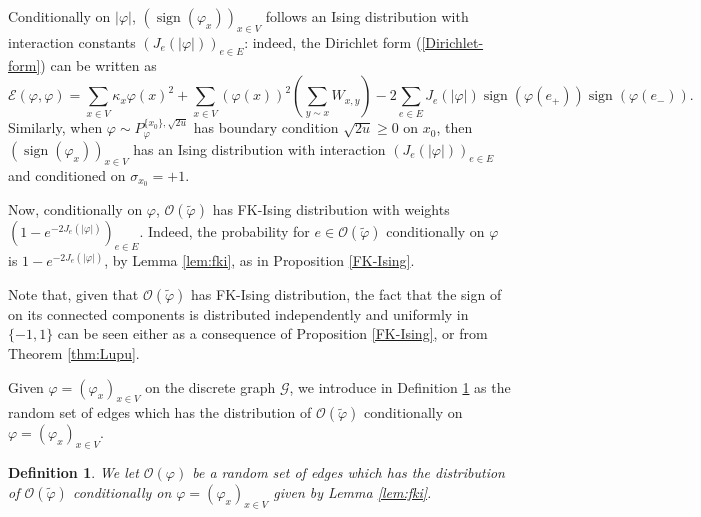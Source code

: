 \documentclass[11pt,a4paper]{amsart}
\numberwithin{equation}{section}
\newtheorem{definition}{Definition}[section]
\begin{document}
Conditionally on $\vert\varphi\vert$,
$(\operatorname{sign}(\varphi_{x}))_{x\in V}$ follows an Ising distribution with interaction constants $(J_{e}(\vert\varphi\vert))_{e\in E}$:
indeed, the Dirichlet form (\ref{Dirichlet-form}) can be written as
\begin{displaymath}
\mathcal{E}(\varphi,\varphi)=\sum_{x\in V}\kappa_{x} \varphi(x)^{2}+
\sum_{x\in V}(\varphi(x))^2(\sum_{y\sim x} W_{x,y})-
2\sum_{e\in E}J_e(\vert\varphi\vert) \operatorname{sign}(\varphi(e_{+}))\operatorname{sign}(\varphi(e_{-})).
\end{displaymath}
Similarly, when $\varphi\sim P_{\varphi}^{\{x_0\},\sqrt{2u}}$ has boundary condition $\sqrt{2u}\ge 0$ on $x_0$, then $(\operatorname{sign}(\varphi_{x}))_{x\in V}$ has an Ising distribution
with interaction $(J_{e}(\vert\varphi\vert))_{e\in E}$ and conditioned on $\sigma_{x_0}=+1$.

Now, conditionally on $\varphi$, $\mathcal{O}(\tilde{\varphi})$ has FK-Ising distribution  with weights
$(1-e^{-2J_{e}(\vert\varphi\vert)})_{e\in E}$. Indeed, the probability for $e\in\mathcal{O}(\tilde{\varphi})$ conditionally on $\varphi$ is $1-e^{-2J_{e}(\vert\varphi\vert)}$,  by Lemma \ref{lem:fki}, as in Proposition \ref{FK-Ising}. 

Note that, given that $\mathcal{O}(\tilde{\varphi})$ has FK-Ising distribution, the fact that the sign of on its connected components is distributed independently and uniformly in $\{-1,1\}$ can be seen either as a consequence of Proposition \ref{FK-Ising}, or from Theorem \ref{thm:Lupu}.

Given $\varphi=(\varphi_x)_{x\in V}$ on the discrete graph $\mathcal{G}$, we introduce in Definition \ref{def_FK-Ising} as the random set of edges which has the distribution of $\mathcal{O}(\tilde{\varphi})$ conditionally on $\varphi=(\varphi_x)_{x\in V}$. 
\begin{definition}\label{def_FK-Ising}
We let $\mathcal{O}(\varphi)$ be a random set of edges which has the distribution of $\mathcal{O}(\tilde{\varphi})$ conditionally on $\varphi=(\varphi_x)_{x\in V}$ given by Lemma \ref{lem:fki}.
\end{definition}
\end{document}
